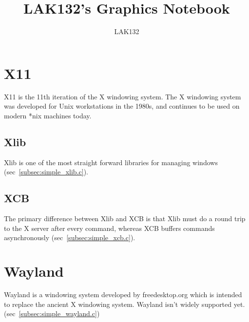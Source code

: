 \documentclass{article}
\title{LAK132's Graphics Notebook}
\author{LAK132}
\begin{document}
\maketitle

\tableofcontents


\section{X11}
\label{sec:x11}

X11 is the 11th iteration of the X windowing system.
The X windowing system was developed for Unix workstations in the 1980s,
and continues to be used on modern *nix machines today.

\subsection{Xlib}
\label{subsec:xlib}

Xlib is one of the most straight forward libraries for managing windows
(sec~\ref{subsec:simple_xlib.c}).

\subsection{XCB}
\label{subsec:xcb}

The primary difference between Xlib and XCB is that Xlib must do a round trip
to the X server after every command,
whereas XCB buffers commands asynchronously (sec~\ref{subsec:simple_xcb.c}).


\section{Wayland}
\label{sec:wayland}

Wayland is a windowing system developed by freedesktop.org which is intended to
replace the ancient X windowing system.
Wayland isn't widely supported yet.
(sec~\ref{subsec:simple_wayland.c})

\end{document}
